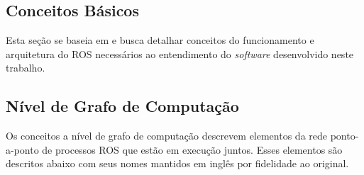 \subsection{Conceitos Básicos}
Esta seção se baseia em \citep{ros_concepts} e busca detalhar conceitos do funcionamento e arquitetura do ROS necessários ao entendimento do \textit{software} desenvolvido neste trabalho. 


\subsection{Nível de Grafo de Computação}
Os conceitos a nível de grafo de computação descrevem elementos da rede ponto-a-ponto de processos ROS que estão em execução juntos. Esses elementos são descritos abaixo com seus nomes mantidos em inglês por fidelidade ao original.
